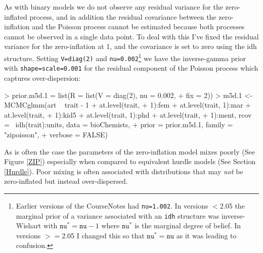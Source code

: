 \documentclass{article}
\begin{document}
As with binary models we do not observe any residual variance for the zero-inflated process, and in addition the residual covariance between the zero-inflation and the Poisson process cannot be estimated because both processes cannot be observed in a single data point. To deal with this I've fixed the residual variance for the zero-inflation at 1, and the covariance is set to zero using the idh structure. Setting \texttt{V=diag(2)} and \texttt{nu=0.002}\footnote{Earlier versions of the CourseNotes had \texttt{nu=1.002}. In versions $<$2.05 the marginal prior of a variance associated with an \texttt{idh} structure was inverse-Wishart with $\texttt{nu}^{\ast}=\texttt{nu}-1$ where $\texttt{nu}^{\ast}$ is the marginal degree of belief. In versions $>=$2.05 I changed this so that $\texttt{nu}^{\ast}=\texttt{nu}$ as it was leading to confusion.} we have the inverse-gamma prior with \texttt{shape=scale=0.001} for the residual component of the Poisson process which captures over-dispersion:

\begin{Schunk}
\begin{Sinput}
> prior.m5d.1 = list(R = list(V = diag(2), nu = 0.002, 
+     fix = 2))
> m5d.1 <- MCMCglmm(art ~ trait - 1 + at.level(trait, 
+     1):fem + at.level(trait, 1):mar + at.level(trait, 
+     1):kid5 + at.level(trait, 1):phd + at.level(trait, 
+     1):ment, rcov = ~idh(trait):units, data = bioChemists, 
+     prior = prior.m5d.1, family = "zipoisson", 
+     verbose = FALSE)
\end{Sinput}
\end{Schunk}

As is often the case the parameters of the zero-inflation model mixes poorly (See Figure \ref{ZIP}) especially when compared to equivalent hurdle models (See Section \ref{Hurdle}). Poor mixing is often associated with distributions that may \emph{not} be zero-inflated but instead over-dispersed.\\  
\end{document}
